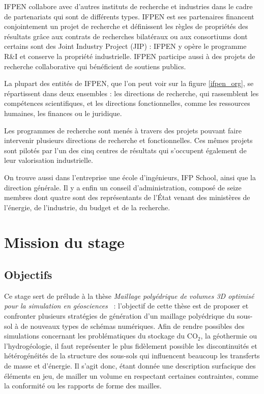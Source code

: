 \documentclass[12pt,a4paper]{report}
\begin{document}
IFPEN collabore avec d'autres instituts de recherche et industries dans le cadre de partenariats qui sont de différents types. IFPEN est ses partenaires financent conjointement un projet de recherche et définissent les règles de propriétés des résultats grâce aux contrats de recherches bilatéraux ou aux consortiums dont certains sont des Joint Industry Project (JIP) : IFPEN y opère le programme R\&I et conserve la propriété industrielle. IFPEN participe aussi à des projets de recherche collaborative qui bénéficient de soutiens publics.

La plupart des entités de IFPEN, que l'on peut voir sur la figure \ref{ifpen_org}, se répartissent dans deux ensembles : les directions de recherche, qui rassemblent les compétences scientifiques, et les directions fonctionnelles, comme les ressources humaines, les finances ou le juridique.

Les programmes de recherche sont menés à travers des projets pouvant faire intervenir plusieurs directions de recherche et fonctionnelles. Ces mêmes projets sont pilotés par l'un des cinq centres de résultats qui s'occupent également de leur valorisation industrielle.

On trouve aussi dans l'entreprise une école d'ingénieurs, IFP School, ainsi que la direction générale. Il y a enfin un conseil d'administration, composé de seize membres dont quatre sont des représentants de l'\'Etat venant des ministères de l'énergie, de l'industrie, du budget et de la recherche.

\newpage
\section{Mission du stage}

\subsection{Objectifs}

Ce stage sert de prélude à la thèse \og \emph{Maillage polyédrique de volumes 3D optimisé pour la simulation en géosciences} \fg{}~: l'objectif de cette thèse est de proposer et confronter plusieurs stratégies de génération d'un maillage polyédrique du sous-sol à de nouveaux types de schémas numériques. Afin de rendre possibles des simulations concernant les problématiques du stockage du CO$_2$, la géothermie ou l'hydrogéologie, il faut représenter le plus fidèlement possible les discontinuités et hétérogénéités de la structure des sous-sols qui influencent beaucoup les transferts de masse et d'énergie. Il s'agit donc, étant donnée une description surfacique des éléments en jeu, de mailler un volume en respectant certaines contraintes, comme la conformité ou les rapports de forme des mailles.
\end{document}
